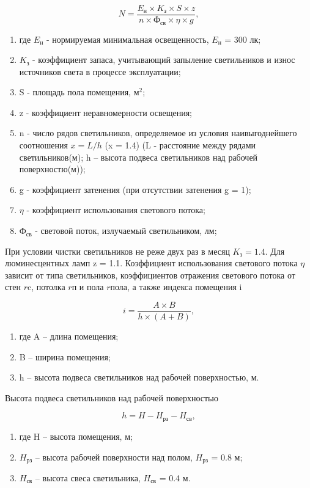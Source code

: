\begin{equation}\label{eq:main}
    N = \dfrac{E_{\text{н}} \times K_{\text{з}} \times S \times z}{n \times \text{Ф}_{\text{св}} \times \eta \times g},
\end{equation} 
\begin{enumerate}[  ]
    \item где $E_{\text{н}}$ - нормируемая минимальная освещенность, $E_{\text{н}}$ = 300 лк;
    \item $K_{\text{з}}$ - коэффициент запаса, учитывающий запыление светильников и износ источников света в процессе эксплуатации;
    \item S - площадь пола помещения, ${\text{м}}^2$; 
    \item z - коэффициент неравномерности освещения;
    \item n - число рядов светильников, определяемое из условия наивыгоднейшего соотношения $x = L \slash h$ (x = 1.4)
          (L - расстояние между рядами светильников(м); h -- высота подвеса светильников над рабочей поверхностю(м));
    \item g - коэффициент затенения (при отсутствии затенения g = 1); 
    \item $\eta$ - коэффициент использования светового потока; 
    \item ${\text{Ф}}_{\text{св}}$ - световой поток, излучаемый светильником, лм; 
\end{enumerate}

При условии чистки светильников не реже двух раз в месяц $K_{\text{з}} = 1.4$. 
Для люминесцентных ламп z = 1.1. Коэффициент использования светового потока $\eta$ зависит от типа светильников,
коэффициентов отражения светового потока от стен $r{\text{c}}$, потолка $r{\text{п}}$ и пола $r{\text{пола}}$,
а также индекса помещения i

\begin{equation}\label{eq:index}
    i = \dfrac{A \times B}{h \times (A + B)},
\end{equation}
\begin{enumerate}[  ]
    \item где A -- длина помещения;
    \item B -- ширина помещения;
    \item h -- высота подвеса светильников над рабочей поверхностью, м.
\end{enumerate}

Высота подвеса светильников над рабочей поверхностью

\begin{equation}\label{eq:high}
    h = H - H_{\text{рз}} - H_{\text{св}},
\end{equation}
\begin{enumerate}[  ]
    \item где H -- высота помещения, м;
    \item $H_{\text{рз}}$ -- высота рабочей поверхности над полом, $H_{\text{рз}}$ = 0.8 м;
    \item $H_{\text{св}}$ -- высота свеса светильника, $H_{\text{св}}$ = 0.4 м.
\end{enumerate}

